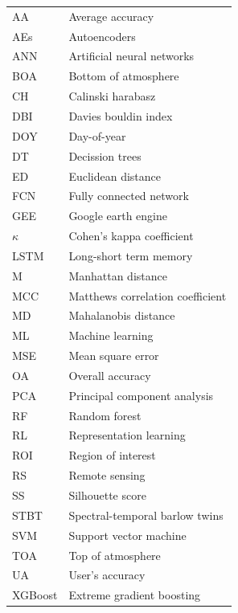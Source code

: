 \documentclass[journal,article,submit,pdftex,moreauthors]{Definitions/mdpi}
\providecommand{\DIFaddend}{} %
\begin{document}
{\noindent 
\begin{tabular}{@{}ll}
AA & Average accuracy\\
AEs & Autoencoders\\
ANN & Artificial neural networks\\
BOA & Bottom of atmosphere\\
CH & Calinski harabasz\\
DBI & Davies bouldin index\\
DOY & Day-of-year\\
DT & Decission trees\\
ED & Euclidean distance\\
FCN & Fully connected network\\
GEE & Google earth engine\\
$\kappa$ & Cohen’s kappa coefficient\\
LSTM &  Long-short term memory\\
M & Manhattan distance\\
MCC & Matthews correlation coefficient\\
MD & Mahalanobis distance\\
ML & Machine learning\\
MSE & Mean square error\\
OA & Overall accuracy\\
PCA & Principal component analysis\\
RF & Random forest\\
RL & Representation learning\\
ROI & Region of interest\\
RS & Remote sensing\\
SS & Silhouette score\\
STBT & Spectral-temporal barlow twins\\
SVM & Support vector machine\\
TOA & Top of atmosphere\\
UA & User's accuracy\\
XGBoost & Extreme gradient boosting \\
\end{tabular}
}
\DIFaddend 
\end{document}

